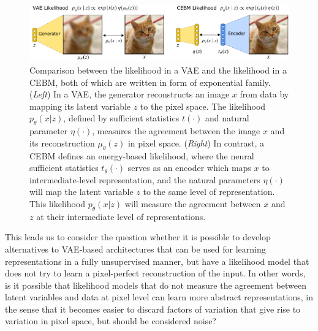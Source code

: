 \documentclass{article}
\begin{document}
\begin{figure}[!t]
\centering
\includegraphics[width=\textwidth]{figures/cebm_overview_v2.pdf}
\vspace*{-4ex}
\caption{Comparison between the likelihood in a VAE and the likelihood in a CEBM, both of which are written in form of exponential family. (\emph{Left}) In a VAE, the generator reconstructs an image $x$ from data by mapping its latent variable $z$ to the pixel space. The likelihood $p_\theta(x | z)$, defined by sufficient statistics $t(\cdot)$ and natural parameter $\eta(\cdot)$, measures the agreement between the image $x$ and its reconstruction $\mu_\theta(z)$ in pixel space. (\emph{Right}) In contrast, a CEBM defines an energy-based likelihood, where the neural sufficient statistics $t_\theta(\cdot)$ serves as an encoder which maps $x$ to intermediate-level representation, and the natural parameters $\eta(\cdot)$ will map the latent variable $z$ to the same level of representation. This likelihood $p_\theta(x | z)$ will measure the agreement between $x$ and $z$ at their intermediate level of representations.}
\label{fig:overview}
\end{figure}



This leads us to consider the question whether it is possible to develop alternatives to VAE-based architectures that can be used for learning representations in a fully unsupervised manner, but have a likelihood model that does not try to learn a pixel-perfect reconstruction of the input. In other words, is it possible that likelihood models that do not measure the agreement between latent variables and data at pixel level can learn more abstract representations, in the sense that it becomes easier to discard factors of variation that give rise to variation in pixel space, but should be considered noise?
\end{document}
